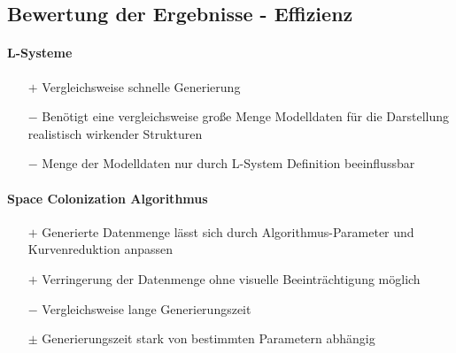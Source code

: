 \newpage
\subsection{Bewertung der Ergebnisse - Effizienz\\}

\paragraph{L-Systeme\\}

\begin{itemize}
	\item[$+$] Vergleichsweise schnelle Generierung\\
	
	\item[$-$] Benötigt eine vergleichsweise große Menge Modelldaten für die Darstellung realistisch wirkender Strukturen\\
	
	\item[$-$] Menge der Modelldaten nur durch L-System Definition beeinflussbar
\end{itemize}





\newpage
\paragraph{Space Colonization Algorithmus\\}

\begin{itemize}
	\item[$+$] Generierte Datenmenge lässt sich durch Algorithmus-Parameter und Kurvenreduktion anpassen\\
	
	\item[$+$] Verringerung der Datenmenge ohne visuelle Beeinträchtigung möglich\\
	
	\item[$-$] Vergleichsweise lange Generierungszeit\\
	
	\item[$\pm$] Generierungszeit stark von bestimmten Parametern abhängig
\end{itemize}





